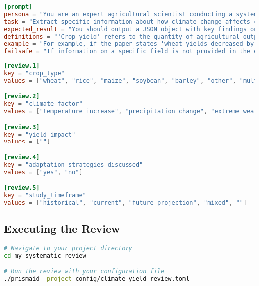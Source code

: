 \begin{configbox}
\begin{lstlisting}[language=TOML]
[prompt]
persona = "You are an expert agricultural scientist conducting a systematic review on climate change impacts."
task = "Extract specific information about how climate change affects crop yields from the scientific paper text provided."
expected_result = "You should output a JSON object with key findings on crop types, climate factors, and measured impacts."
definitions = "'Crop yield' refers to the quantity of agricultural output harvested per unit of land area."
example = "For example, if the paper states 'wheat yields decreased by 5.2% per degree Celsius increase', report 'wheat' as crop_type, 'temperature increase' as climate_factor, and '-5.2% per °C' as yield_impact."
failsafe = "If information on a specific field is not provided in the document, respond with an empty string value."
\end{lstlisting}
\end{configbox}

\begin{configbox}
\begin{lstlisting}[language=TOML]
[review.1]
key = "crop_type"
values = ["wheat", "rice", "maize", "soybean", "barley", "other", "multiple", ""]

[review.2]
key = "climate_factor"
values = ["temperature increase", "precipitation change", "extreme weather", "CO2 levels", "multiple factors", "other", ""]

[review.3]
key = "yield_impact"
values = [""]

[review.4]
key = "adaptation_strategies_discussed"
values = ["yes", "no"]

[review.5]
key = "study_timeframe"
values = ["historical", "current", "future projection", "mixed", ""]
\end{lstlisting}
\end{configbox}


\subsection{Executing the Review}

\begin{commandbox}
\begin{lstlisting}[language=Bash]
# Navigate to your project directory
cd my_systematic_review

# Run the review with your configuration file
./prismaid -project config/climate_yield_review.toml
\end{lstlisting}
\end{commandbox}

